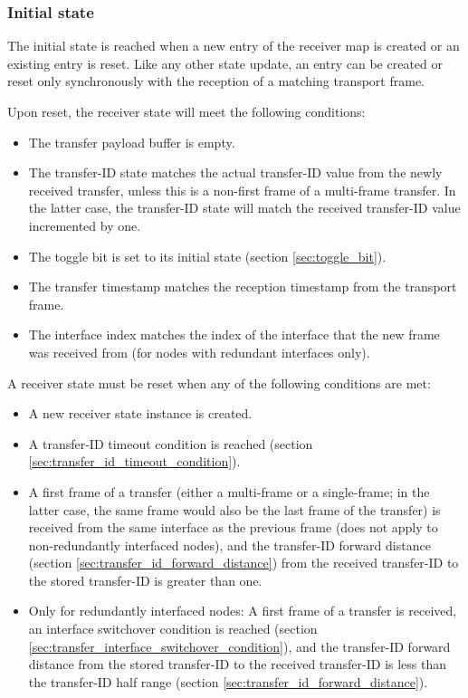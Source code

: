\subsubsection{Initial state}\label{sec:transfer_reception_initial_state}

The initial state is reached when a new entry of the receiver map is created or an existing entry is reset.
Like any other state update, an entry can be created or reset only synchronously with
the reception of a matching transport frame.

Upon reset, the receiver state will meet the following conditions:

\begin{itemize}
    \item The transfer payload buffer is empty.
    \item The transfer-ID state matches the actual transfer-ID value from the newly received transfer,
    unless this is a non-first frame of a multi-frame transfer.
    In the latter case, the transfer-ID state will match the received transfer-ID value incremented by one.
    \item The toggle bit is set to its initial state (section \ref{sec:toggle_bit}).
    \item The transfer timestamp matches the reception timestamp from the transport frame.
    \item The interface index matches the index of the interface that the new frame was received from
    (for nodes with redundant interfaces only).
\end{itemize}

A receiver state must be reset when any of the following conditions are met:

\begin{itemize}
    \item A new receiver state instance is created.

    \item A transfer-ID timeout condition is reached (section \ref{sec:transfer_id_timeout_condition}).

    \item A first frame of a transfer (either a multi-frame or a single-frame; in the latter case, the same frame
    would also be the last frame of the transfer) is received from the same interface as the previous frame
    (does not apply to non-redundantly interfaced nodes),
    and the transfer-ID forward distance (section \ref{sec:transfer_id_forward_distance}) from the received
    transfer-ID to the stored transfer-ID is greater than one.

    \item Only for redundantly interfaced nodes: A first frame of a transfer is received,
    an interface switchover condition is reached (section \ref{sec:transfer_interface_switchover_condition}),
    and the transfer-ID forward distance from the stored transfer-ID to the received transfer-ID is
    less than the transfer-ID half range (section \ref{sec:transfer_id_forward_distance}).
\end{itemize}

